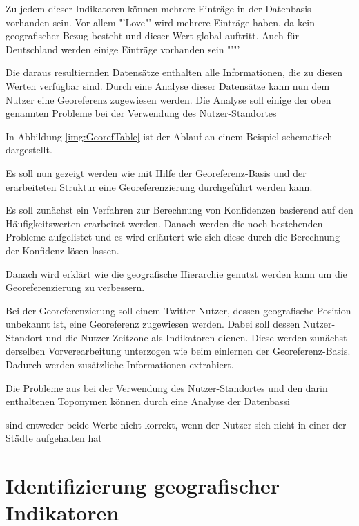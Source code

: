 		Zu jedem dieser Indikatoren können mehrere Einträge in der Datenbasis vorhanden sein. 
		Vor allem "'Love"' wird mehrere Einträge haben, da kein geografischer Bezug besteht und dieser Wert global auftritt.
		Auch für Deutschland werden einige Einträge vorhanden sein "'"'    
		
		


		Die daraus resultiernden Datensätze enthalten alle Informationen, die zu diesen Werten verfügbar sind.
		Durch eine Analyse dieser Datensätze kann nun dem Nutzer eine Georeferenz zugewiesen werden.
		Die Analyse soll einige der oben genannten Probleme bei der Verwendung des Nutzer-Standortes

		In Abbildung \ref{img:GeorefTable} ist der Ablauf an einem Beispiel schematisch dargestellt.  

		Es soll nun gezeigt werden wie mit Hilfe der Georeferenz-Basis und der erarbeiteten Struktur eine Georeferenzierung durchgeführt werden kann.

		Es soll zunächst ein Verfahren zur Berechnung von Konfidenzen basierend auf den Häufigkeitswerten erarbeitet werden. 
		Danach werden die noch bestehenden Probleme aufgelistet und es wird erläutert wie sich diese durch die Berechnung der Konfidenz lösen lassen. 

		Danach wird erklärt wie die geografische Hierarchie genutzt werden kann um die Georeferenzierung zu verbessern.


		Bei der Georeferenzierung soll einem Twitter-Nutzer, dessen geografische Position unbekannt ist, eine Georeferenz zugewiesen werden.
		Dabei soll dessen Nutzer-Standort und die Nutzer-Zeitzone als Indikatoren dienen. 
		Diese werden zunächst derselben Vorverearbeitung unterzogen wie beim einlernen der Georeferenz-Basis.
		Dadurch werden zusätzliche Informationen extrahiert.


		Die Probleme aus bei der Verwendung des Nutzer-Standortes und den darin enthaltenen Toponymen können durch eine Analyse der Datenbassi 



				 sind entweder beide Werte nicht korrekt, wenn der Nutzer sich nicht in einer der Städte aufgehalten hat




		\section{Identifizierung geografischer Indikatoren}


